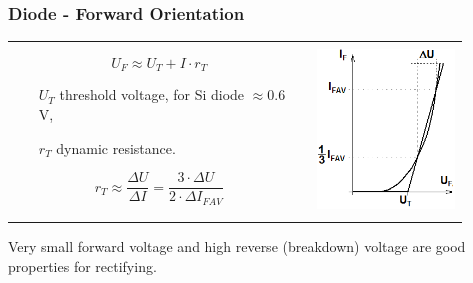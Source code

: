 \documentclass{beamer}
\begin{document}
	\begin{frame}
    \frametitle{Diode - Forward Orientation}
		\begin{center}
			\begin{tabular}{m{0.60\linewidth} m{0.30\linewidth}}
			$$U_F\approx U_T + I\cdot r_T$$
			
			\begin{itemize}
				\item[$U_T$] threshold voltage, for Si diode $\approx 0.6$ V,
				\item[$r_T$] dynamic resistance.
			\end{itemize}
			$$r_T \approx \frac{\Delta U}{\Delta I} = \frac{3\cdot\Delta U}{2\cdot\Delta I_{FAV}}$$
			& \includegraphics[scale=0.5]{obr10_propustnySmer} 
			\end{tabular}
		\end{center}
		Very small forward voltage and high reverse (breakdown) voltage are good properties for rectifying.
	\end{frame}
\end{document}
